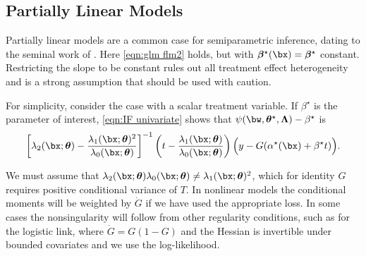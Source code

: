 \documentclass[12pt]{article}
\numberwithin{equation}{section}
\theoremstyle{definition}
\newcommand{\btheta}{\boldsymbol{\theta}}
\newcommand{\bbeta}{\boldsymbol{\beta}}
\newcommand{\bL}{\boldsymbol{\Lambda}}
\newcommand{\bttrue}{\btheta^\star}
\newcommand{\atrue}{\alpha^\star}
\newcommand{\btrue}{\beta^\star}
\newcommand{\bbtrue}{\bbeta^\star}
\begin{document}
\begin{appendices}
\subsection{Partially Linear Models}

Partially linear models are a common case for semiparametric inference, dating to the seminal work of \cite{Robinson1988_Ecma}. Here \eqref{eqn:glm flm2} holds, but with $\bbtrue(\bx) = \bbtrue$ constant. Restricting the slope to be constant rules out all treatment effect heterogeneity and is a strong assumption that should be used with caution. 

For simplicity, consider the case with a scalar treatment variable. If $\btrue$ is the parameter of interest, \eqref{eqn:IF univariate} shows that $\psi(\bw, \bttrue, \bL) - \btrue$ is
\[
	  \left[\lambda_2(\bx; \btheta) - \frac{\lambda_1(\bx; \btheta)^2}{\lambda_0(\bx; \btheta)}\right]^{-1}\left(t - \frac{\lambda_1(\bx; \btheta)}{\lambda_0(\bx; \btheta)}\right) \Big(y - G(\atrue(\bx) + \btrue t ) \Big).
\]

We must assume that $\lambda_2(\bx; \btheta)\lambda_0(\bx; \btheta) \neq \lambda_1(\bx; \btheta)^2$, which for identity $G$ requires positive conditional variance of $T$. In nonlinear models the conditional moments will be weighted by $\dot{G}$ if we have used the appropriate loss. In some cases the nonsingularity will follow from other regularity conditions, such as for the logistic link, where $\dot{G} = G(1-G)$ and the Hessian is invertible under bounded covariates and we use the log-likelihood.


\end{appendices}
\end{document}

